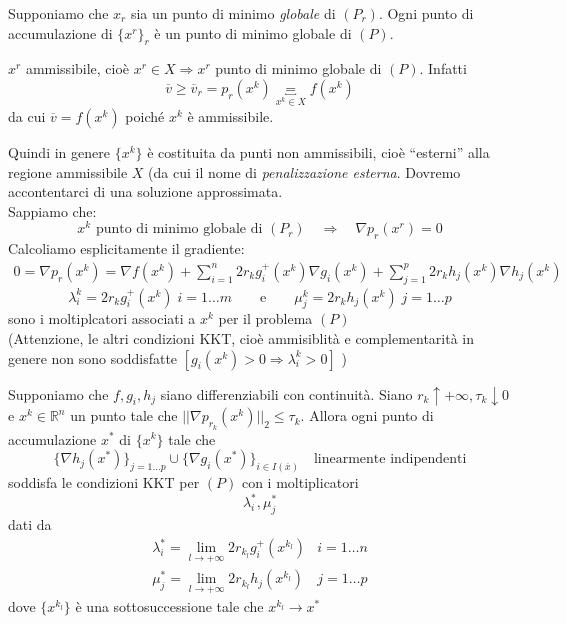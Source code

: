 \begin{proposition}
  Supponiamo che $x_r$ sia un punto di minimo
 \emph{globale} di $(P_r)$.
Ogni punto di accumulazione di $\{x^r\}_r$ \`e
un punto di minimo globale di $(P)$.
\end{proposition}
\begin{observation}
$x^{r}$ ammissibile, cio\`e $x^{r} \in X \Rightarrow x^{r}$ punto
di minimo globale di $(P)$. Infatti
$$ \overline{v} \geq \overline{v}_{r} = p_{r}(x^k) 
\underbracket{=}_{x^{k} \in X}  f(x^{k})$$ da cui
$\overline{v} = f(x^{k})$ poich\'e $x^{k}$ \`e ammissibile.
\end{observation}
Quindi in genere $\{x^{k} \}$ \`e costituita da punti
non ammissibili, cio\`e ``esterni'' alla regione
ammissibile $X$ (da cui il nome di \emph{penalizzazione esterna}.
Dovremo accontentarci di una soluzione approssimata.\\
Sappiamo che:
$$ x^{k} \text{ punto di minimo globale di } (P_r) \quad
\Rightarrow \quad \nabla p_r(x^{r}) = 0 $$
Calcoliamo esplicitamente il gradiente:
$$
\begin{array}{l}
0 =  \nabla p_r(x^{k}) = 
\nabla f(x^{k}) +
\displaystyle \sum_{i=1}^{n} 2r_k g_i^{+}(x^{k})
\nabla g_i(x^{k}) + \displaystyle \sum_{j=1}^{p} 2r_k h_j(x^{k})
\nabla h_j(x^{k})
\end{array}
$$
$$ \lambda_i^{k} =  2r_{k}g_i^{+}(x^{k}) \; i=1\ldots m
\qquad  \text{e} \qquad
\mu_j^{k} = 2r_{k}h_j(x^k) \; j=1\ldots p$$
 sono i moltiplcatori associati
a $x^{k}$ per il problema $(P)$ \\
 (Attenzione, le altri condizioni
KKT, cio\`e ammisiblit\`a e complementarit\`a in genere
non sono soddisfatte $[g_i(x^{k}) > 0 \Rightarrow \lambda_i^{k} > 0 ]$
)
\begin{theo}
Supponiamo che $f, g_i, h_j$ siano differenziabili
con continuit\`a. Siano
$r_k \uparrow + \infty, \tau_k \downarrow 0$ e
$x^{k} \in \mathbb{R}^{n}$ un punto tale che
$||\nabla p_{r_k}(x^{k})||_{2} \leq \tau_k$.
Allora ogni punto di accumulazione $x^{*}$ di
$\{x^{k}\}$ tale che
$$
\{ \nabla h_j(x^{*}) \}_{j=1\ldots p}  \cup
\{ \nabla g_i(x^{*}) \}_{i \in I(\overline{x})}
\quad \text{linearmente indipendenti}
$$
soddisfa le condizioni
KKT per $(P)$ con i moltiplicatori
$$ \lambda_i^{*}, \mu_j^{*}$$
dati da
$$
\begin{array}{ll}
\displaystyle \lambda_i^{*} = \lim_{l \to + \infty}
2r_{{k}_l} g^{+}_i(x^{k_l})  &  i =1 \ldots n \\
\displaystyle \mu_{j}^{*} = \lim_{l \to + \infty} 2r_{k_{l}}
h_j(x^{k_l}) & j =1 \ldots p
\end{array}
 $$
dove $\{x^{k_l}\}$ \`e una sottosuccessione tale che
$x^{k_l} \rightarrow x^{*} $
\end{theo}

